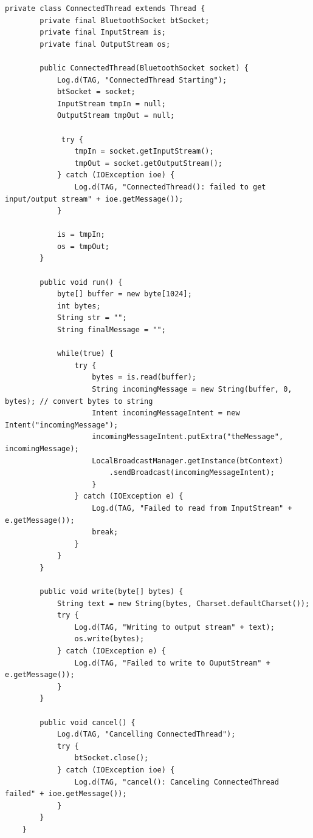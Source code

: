 \documentclass[12pt,a4paper]{article}
\begin{document}
    \begin{lstlisting}[label={lst:connectedThread}, caption=ConnectedThread class]
     private class ConnectedThread extends Thread {
        private final BluetoothSocket btSocket;
        private final InputStream is;
        private final OutputStream os;

        public ConnectedThread(BluetoothSocket socket) {
            Log.d(TAG, "ConnectedThread Starting");
            btSocket = socket;
            InputStream tmpIn = null;
            OutputStream tmpOut = null;

             try {
                tmpIn = socket.getInputStream();
                tmpOut = socket.getOutputStream();
            } catch (IOException ioe) {
                Log.d(TAG, "ConnectedThread(): failed to get input/output stream" + ioe.getMessage());
            }

            is = tmpIn;
            os = tmpOut;
        }

        public void run() {
            byte[] buffer = new byte[1024];
            int bytes;
            String str = "";
            String finalMessage = "";

            while(true) {
                try {
                    bytes = is.read(buffer);
                    String incomingMessage = new String(buffer, 0, bytes); // convert bytes to string
                    Intent incomingMessageIntent = new Intent("incomingMessage");
                    incomingMessageIntent.putExtra("theMessage", incomingMessage);
                    LocalBroadcastManager.getInstance(btContext)
                        .sendBroadcast(incomingMessageIntent);
                    }
                } catch (IOException e) {
                    Log.d(TAG, "Failed to read from InputStream" + e.getMessage());
                    break;
                }
            }
        }

        public void write(byte[] bytes) {
            String text = new String(bytes, Charset.defaultCharset());
            try {
                Log.d(TAG, "Writing to output stream" + text);
                os.write(bytes);
            } catch (IOException e) {
                Log.d(TAG, "Failed to write to OuputStream" + e.getMessage());
            }
        }

        public void cancel() {
            Log.d(TAG, "Cancelling ConnectedThread");
            try {
                btSocket.close();
            } catch (IOException ioe) {
                Log.d(TAG, "cancel(): Canceling ConnectedThread failed" + ioe.getMessage());
            }
        }
    }
    \end{lstlisting}
    
\end{document}
